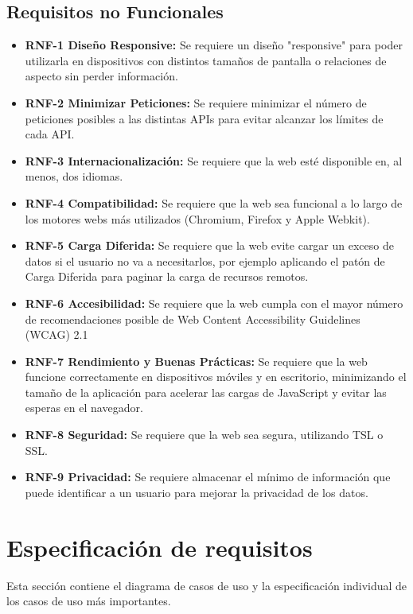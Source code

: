 \subsection{Requisitos no Funcionales}\label{requisitos-no-funcionales}
\begin{itemize}
    \item \textbf{RNF-1 Diseño Responsive:} Se requiere un diseño "responsive" para poder utilizarla en dispositivos con distintos tamaños de pantalla o relaciones de aspecto sin perder información.
    \item \textbf{RNF-2 Minimizar Peticiones:} Se requiere minimizar el número de peticiones posibles a las  distintas APIs para evitar alcanzar los límites de cada API. 
    \item \textbf{RNF-3 Internacionalización:} Se requiere que la web esté disponible en, al menos, dos idiomas.
    
    \item\textbf{RNF-4 Compatibilidad:} Se requiere que la web sea funcional a lo largo de los motores webs más utilizados (Chromium, Firefox y Apple Webkit).
    \item\textbf{RNF-5 Carga Diferida:} Se requiere que la web evite cargar un exceso de datos si el usuario no va a necesitarlos, por ejemplo aplicando el patón de Carga Diferida para paginar la carga de recursos remotos. 
    \item\textbf{RNF-6 Accesibilidad:} Se requiere que la web cumpla con el mayor número de recomendaciones posible de Web Content Accessibility Guidelines (WCAG) 2.1
    \item\textbf{RNF-7 Rendimiento y Buenas Prácticas:} Se requiere que la web funcione correctamente en dispositivos móviles y en escritorio, minimizando el tamaño de la aplicación para acelerar las cargas de JavaScript y evitar las esperas en el navegador.
    \item\textbf{RNF-8 Seguridad:} Se requiere que la web sea segura, utilizando TSL o SSL.
    \item\textbf{RNF-9 Privacidad:} Se requiere almacenar el mínimo de información que puede identificar a un usuario para mejorar la privacidad de los datos. 
\end{itemize}
\clearpage

\section{Especificación de requisitos}
Esta sección contiene el diagrama de casos de uso y la especificación individual de los casos de uso más importantes. 

